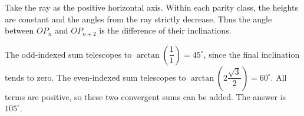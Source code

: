 Take the ray as the positive horizontal axis. Within each parity class, the heights are constant and the angles from the ray strictly decrease. Thus the angle between $OP_n$ and $OP_{n+2}$ is the difference of their inclinations.

The odd-indexed sum telescopes to $\arctan(\dfrac{1}{1})=45^\circ$, since the final inclination tends to zero. The even-indexed sum telescopes to $\arctan(2\dfrac{\sqrt 3}{2})=60^\circ$. All terms are positive, so these two convergent sums can be added. The answer is $\boxed{105^\circ}$.
